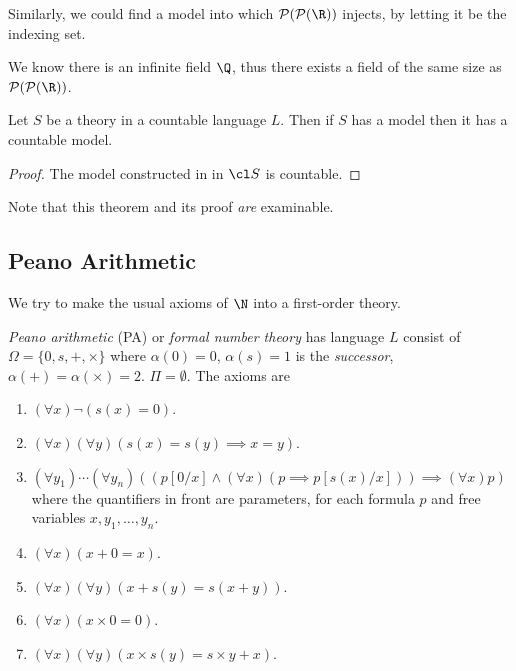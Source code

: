 \documentclass[a4paper]{article}
\begin{document}
Similarly, we could find a model into which \(\mathcal P (\mathcal P(\R))\) injects, by letting it be the indexing set.

\begin{eg}
  We know there is an infinite field \(\Q\), thus there exists a field of the same size as \(\mathcal P (\mathcal P(\R))\).
\end{eg}

\begin{corollary}
  Let \(S\) be a theory in a countable language \(L\). Then if \(S\) has a model then it has a countable model.
\end{corollary}

\begin{proof}
  The model constructed in  in \(\cl S\) is countable.
\end{proof}

Note that this theorem and its proof \emph{are} examinable.

\subsection{Peano Arithmetic}

We try to make the usual axioms of \(\N\) into a first-order theory.

\begin{definition}
  \emph{Peano arithmetic} (PA) or \emph{formal number theory} has language \(L\) consist of \(\Omega = \{0, s, + ,\times\}\) where \(\alpha(0) = 0\), \(\alpha(s) = 1\) is the \emph{successor}, \(\alpha(+) = \alpha(\times) = 2\). \(\Pi = \emptyset\). The axioms are
  \begin{enumerate}
  \item \((\forall x) \neg(s(x) = 0)\).
  \item \((\forall x)(\forall y) (s(x) = s(y) \implies x = y)\).
  \item \((\forall y_1)\cdots (\forall y_n) ((p[0/x] \land (\forall x) (p \implies p[s(x)/x])) \implies (\forall x) p)\) where the quantifiers in front are parameters, for each formula \(p\) and free variables \(x, y_1, \dots, y_n\).
  \item \((\forall x) (x + 0 = x)\).
  \item \((\forall x) (\forall y) (x + s(y) = s(x + y))\).
  \item \((\forall x) (x \times 0 = 0)\).
  \item \((\forall x)(\forall y) (x \times s(y) = s \times y + x)\).
  \end{enumerate}
\end{definition}
\end{document}
